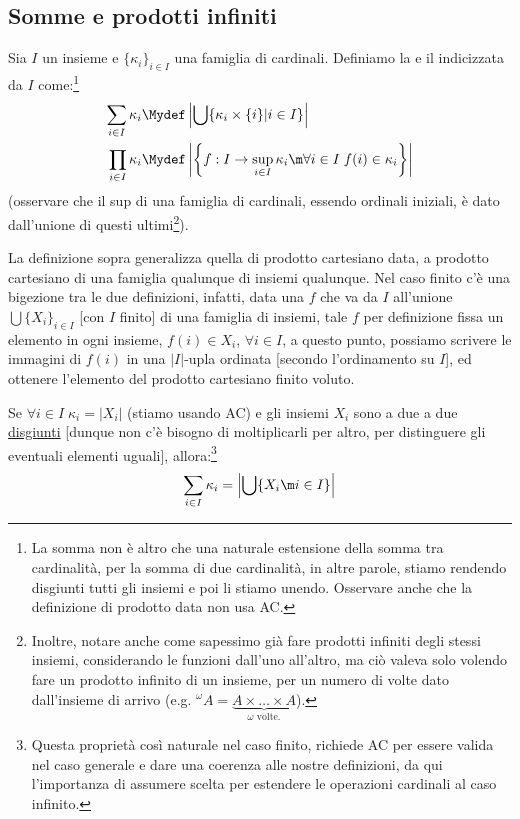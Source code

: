 \documentclass[11pt]{scrartcl}
\begin{document}
\subsection{Somme e prodotti infiniti}

\begin{definition}
	Sia $I$ un insieme e $\{\kappa_i\}_{i \in I}$ una famiglia di cardinali. Definiamo la  e il  indicizzata da $I$ come:\footnote{La somma non è altro che una naturale estensione della somma tra cardinalità, per la somma di due cardinalità, in altre parole, stiamo rendendo disgiunti tutti gli insiemi e poi li stiamo unendo. Osservare anche che la definizione di prodotto data non usa AC.}
	 \begin{align*}
		\sum_{i \in I} \kappa_i &\Mydef\left\lvert \bigcup\{\kappa_i \times \{i\} | i \in I\}\right\rvert \\
		\prod_{i \in I} \kappa_i &\Mydef \left\lvert \left\{f : I \rightarrow \sup_{i \in I} \kappa_i \m  \forall i \in I \; f(i) \in \kappa_i\right\}\right\rvert 
	 \end{align*}
	(osservare che il sup di una famiglia di cardinali, essendo ordinali iniziali, è dato dall'unione di questi ultimi\footnote{Inoltre, notare anche come sapessimo già fare prodotti infiniti degli stessi insiemi, considerando le funzioni dall'uno all'altro, ma ciò valeva solo volendo fare un prodotto infinito di un insieme, per un numero di volte dato dall'insieme di arrivo
	(e.g. ${}^\omega A = \underbrace{A \times \ldots \times A}_{\text{$\omega$ volte}.}$).}).
\end{definition}

\begin{remark}
	La definizione sopra generalizza quella di prodotto cartesiano data, a prodotto cartesiano di una famiglia qualunque di insiemi qualunque. Nel caso finito c'è una bigezione tra le due definizioni, infatti, data una $f$ che va da $I$ all'unione $\bigcup \{X_i\}_{i \in I}$ [con $I$ finito] di una 
	famiglia di insiemi, tale $f$ per definizione fissa un elemento in ogni insieme, $f(i) \in X_i$, $\forall i \in I$, a questo punto, possiamo scrivere le immagini di $f(i)$ in una $|I|$-upla ordinata [secondo l'ordinamento su $I$], ed ottenere l'elemento del prodotto cartesiano finito 
	voluto.
\end{remark}

\begin{note}
	Se $\forall i \in I \; \kappa_i = |X_i|$ (stiamo usando AC) e gli insiemi $X_i$ sono a due a due \underline{disgiunti} [dunque non c'è bisogno di moltiplicarli per altro, per distinguere gli eventuali elementi uguali], allora:\footnote{Questa proprietà così naturale nel caso finito, richiede AC per essere valida nel caso generale e dare una coerenza alle nostre definizioni, da qui l'importanza di assumere scelta per estendere le operazioni cardinali al caso infinito.}
	\[ \sum_{i \in I} \kappa_i = \left\lvert \bigcup\{X_i \m i \in I\}\right\rvert 
		\]
\end{note}
\end{document}
